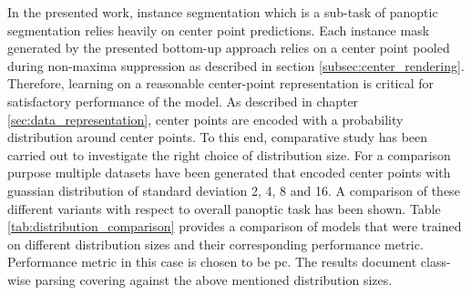 In the presented work, instance segmentation which is a sub-task of panoptic segmentation relies heavily on center point predictions. Each instance mask generated by the presented bottom-up approach relies on a  center point pooled during non-maxima suppression as described in section \ref{subsec:center_rendering}. Therefore, learning on a reasonable center-point representation is critical for satisfactory performance of the model. As described in chapter \ref{sec:data_representation}, center points are encoded with a probability distribution around center points. To this end, comparative study has been carried out to investigate the right choice of distribution size. For a comparison purpose multiple datasets have been generated that encoded center points with guassian distribution of standard deviation 2, 4, 8 and 16. A comparison of these different variants with respect to overall panoptic task has been shown. Table \ref{tab:distribution_comparison} provides a comparison of models that were trained on different distribution sizes and their corresponding performance metric. Performance metric in this case is chosen to be \gls{pc}. The results document class-wise parsing covering against the above mentioned distribution sizes.  

